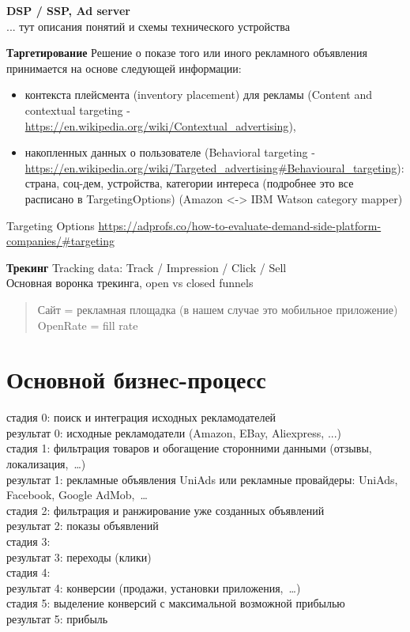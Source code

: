 \documentclass[specification,annotation,times]{itmo-student-thesis}
\begin{document}

\textbf{DSP / SSP, Ad server}
\\
... тут описания понятий и схемы технического устройства


\textbf{Таргетирование}
Решение о показе того или иного рекламного объявления принимается на основе следующей информации:
\begin{itemize}
	\item контекста плейсмента (inventory placement) для рекламы (Content and contextual targeting - \url{https://en.wikipedia.org/wiki/Contextual_advertising}),
	\item накопленных данных о пользователе (Behavioral targeting - \url{https://en.wikipedia.org/wiki/Targeted_advertising#Behavioural_targeting}): страна, соц-дем, устройства, категории интереса (подробнее это все расписано в TargetingOptions) (Amazon <-> IBM Watson category mapper)
\end{itemize}
\bigbreak

Targeting Options \url{https://adprofs.co/how-to-evaluate-demand-side-platform-companies/#targeting}


\textbf{Трекинг}
Tracking data: Track / Impression / Click / Sell
\\
Основная воронка трекинга, open vs closed funnels


\begin{quotation}
  Сайт = рекламная площадка (в нашем случае это мобильное приложение)
  \\
  OpenRate = fill rate

\end{quotation}


\section{Основной бизнес-процесс}

стадия 0: поиск и интеграция исходных рекламодателей
\\
результат 0: исходные рекламодатели (Amazon, EBay, Aliexpress, ...)
\\
стадия 1: фильтрация товаров и обогащение сторонними данными (отзывы, локализация, …)
\\
результат 1: рекламные объявления UniAds или рекламные провайдеры: UniAds, Facebook, Google AdMob, …
\\
стадия 2: фильтрация и ранжирование уже созданных объявлений
\\
результат 2: показы объявлений
\\
стадия 3:
\\
результат 3: переходы (клики)
\\
стадия 4:
\\
результат 4: конверсии (продажи, установки приложения, …)
\\
стадия 5: выделение конверсий с максимальной возможной прибылью
\\
результат 5: прибыль
\\	
\end{document}
